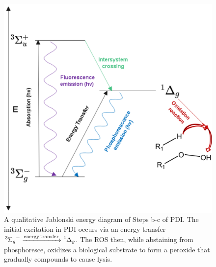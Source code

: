 \begin{figure}
    \centering
    \includegraphics[width = \textwidth]{images/PDIpy/background/jablonski_diagram.png}
    \caption{
        A qualitative Jablonski energy diagram of Steps b-c of PDI. The initial excitation in PDI occurs via an energy transfer $\ce{^3\Sigma_g^- ->[energy transfer] ^1\Delta_g}$. The ROS then, while abstaining from phosphoresce, oxidizes a biological substrate to form a peroxide that gradually compounds to cause lysis.
    }
    \label{jablonski_diagram}
\end{figure}

